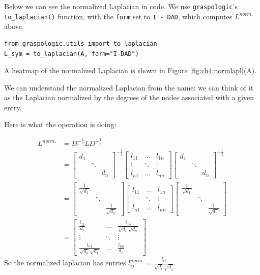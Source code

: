 Below we can see the normalized Laplacian in code. We use \texttt{graspologic}'s \texttt{to\_laplacian()} function, with the \texttt{form} set to \texttt{I - DAD}, which computes $L^{norm.}$ above.
 
\begin{lstlisting}[style=python]
from graspologic.utils import to_laplacian
L_sym = to_laplacian(A, form="I-DAD")
\end{lstlisting}
A heatmap of the normalized Laplacian is shown in Figure \ref{fig:ch4:normlapl}(A).

We can understand the normalized Laplacian from the name: we can think of it as the Laplacian normalized by the degrees of the nodes associated with a given entry.

Here is what the operation is doing:

\begin{align*}
    L^{norm.} &= D^{-\frac{1}{2}}L D^{-\frac{1}{2}} \\
    &= \begin{bmatrix}
        d_{1} & & \\
        & \ddots & \\
        & & d_n
    \end{bmatrix}^{-\frac{1}{2}}\begin{bmatrix}
        l_{11} & ... & l_{1n} \\
        \vdots & \ddots & \vdots \\
        l_{n1} & ... & l_{nn}
    \end{bmatrix}
    \begin{bmatrix}
        d_{1} & & \\
        & \ddots & \\
        & & d_n
    \end{bmatrix}^{-\frac{1}{2}} \\
    &= 
    \begin{bmatrix}
        \frac{1}{\sqrt{d_1}} & & \\
        & \ddots & \\
        & & \frac{1}{\sqrt{d_n}}
    \end{bmatrix}\begin{bmatrix}
        l_{11} & ... & l_{1n} \\
        \vdots & \ddots & \vdots \\
        l_{n1} & ... & l_{nn}
    \end{bmatrix}
    \begin{bmatrix}
        \frac{1}{\sqrt{d_1}} & & \\
        & \ddots & \\
        & & \frac{1}{\sqrt{d_n}}
    \end{bmatrix} \\
    &= \begin{bmatrix}
        \frac{l_{11}}{d_1} & ... & \frac{l_{1n}}{\sqrt{d_1}\sqrt{d_n}} \\
        \vdots & \ddots & \vdots \\
        \frac{l_{n1}}{\sqrt{d_n}\sqrt{d_1}} & ... & \frac{l_{nn}}{d_n}
    \end{bmatrix}
\end{align*}
So the normalized laplacian has entries $l^{norm.}_{ij} = \frac{l_{ij}}{\sqrt{d_i}\sqrt{d_j}}$.

